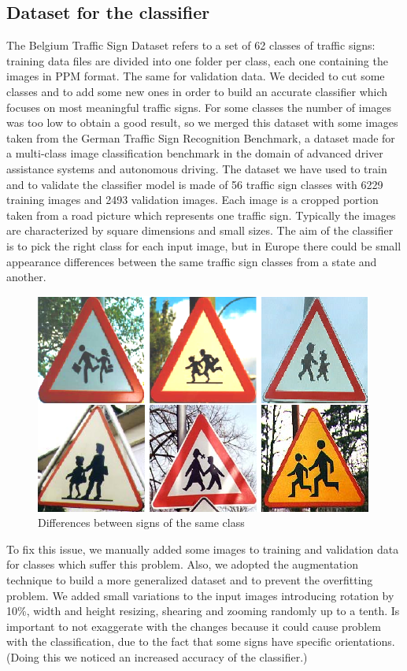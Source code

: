 \subsection{Dataset for the classifier}
The Belgium Traffic Sign Dataset refers to a set of 62 classes of traffic signs: training data files are divided into one folder per class, each one containing the images in PPM format. The same for validation data. We decided to cut some classes and to add some new ones in order to build an accurate classifier which focuses on most meaningful traffic signs. For some classes the number of images was too low to obtain a good result, so we merged this dataset with some images taken from the German Traffic Sign Recognition Benchmark, a dataset made for a multi-class image classification benchmark in the domain of advanced driver assistance systems and autonomous driving. The dataset we have used to train and to validate the classifier model is made of 56 traffic sign classes with 6229 training images and 2493 validation images. Each image is a cropped portion taken from a road picture which represents one traffic sign. Typically the images are characterized by square dimensions and small sizes. 
The aim of the classifier is to pick the right class for each input image, but in Europe there could be small appearance differences between the same traffic sign classes from a state and another.
\begin{figure}{}
	\centering
	\includegraphics[width=0.6\linewidth]{Res/Immagini/differences.png}
	\caption{Differences between signs of the same class}\label{}
\end{figure}
To fix this issue, we manually added some images to training and validation data for classes which suffer this problem. Also, we adopted the augmentation technique to build a more generalized dataset and to prevent the overfitting problem. We added small variations to the input images introducing rotation by 10\%, width and height resizing, shearing and zooming randomly up to a tenth. Is important to not exaggerate with the changes because it could cause problem with the classification, due to the fact that some signs have specific orientations. (Doing this we noticed an increased accuracy of the classifier.)

